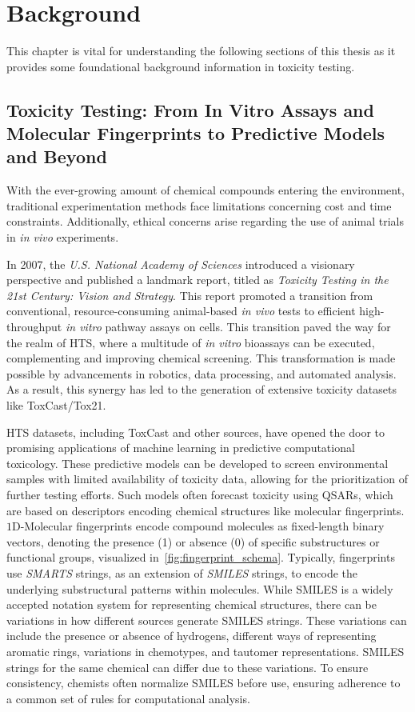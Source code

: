 \chapter{Background}\label{chap:background}
This chapter is vital for understanding the following sections of this thesis as it provides some foundational background information in toxicity testing.

\section{Toxicity Testing: From In Vitro Assays and Molecular Fingerprints to Predictive Models and Beyond}\label{sec:toxicity_testing}

With the ever-growing amount of chemical compounds entering the environment, traditional experimentation methods face limitations concerning cost and time constraints. Additionally, ethical concerns arise regarding the use of animal trials in \emph{in vivo} experiments.

In 2007, the \emph{U.S. National Academy of Sciences} introduced a visionary perspective and published a landmark report, titled as \emph{Toxicity Testing in the 21st Century: Vision and Strategy}. This report promoted a transition from conventional, resource-consuming animal-based \emph{in vivo} tests to efficient high-throughput \emph{in vitro} pathway assays on cells. This transition paved the way for the realm of HTS, where a multitude of \emph{in vitro} bioassays can be executed, complementing and improving chemical screening. This transformation is made possible by advancements in robotics, data processing, and automated analysis. As a result, this synergy has led to the generation of extensive toxicity datasets like ToxCast/Tox21.
 
HTS datasets, including ToxCast and other sources, have opened the door to promising applications of machine learning in predictive computational toxicology. These predictive models can be developed to screen environmental samples with limited availability of toxicity data, allowing for the prioritization of further testing efforts. Such models often forecast toxicity using QSARs, which are based on descriptors encoding chemical structures like molecular fingerprints. $1$D-Molecular fingerprints encode compound molecules as fixed-length binary vectors, denoting the presence (1) or absence (0) of specific substructures or functional groups, visualized in~\ref{fig:fingerprint_schema}. Typically, fingerprints use \emph{SMARTS} strings, as an extension of \emph{SMILES} strings, to encode the underlying substructural patterns within molecules. While SMILES is a widely accepted notation system for representing chemical structures, there can be variations in how different sources generate SMILES strings. These variations can include the presence or absence of hydrogens, different ways of representing aromatic rings, variations in chemotypes, and tautomer representations. SMILES strings for the same chemical can differ due to these variations. To ensure consistency, chemists often normalize SMILES before use, ensuring adherence to a common set of rules for computational analysis.

